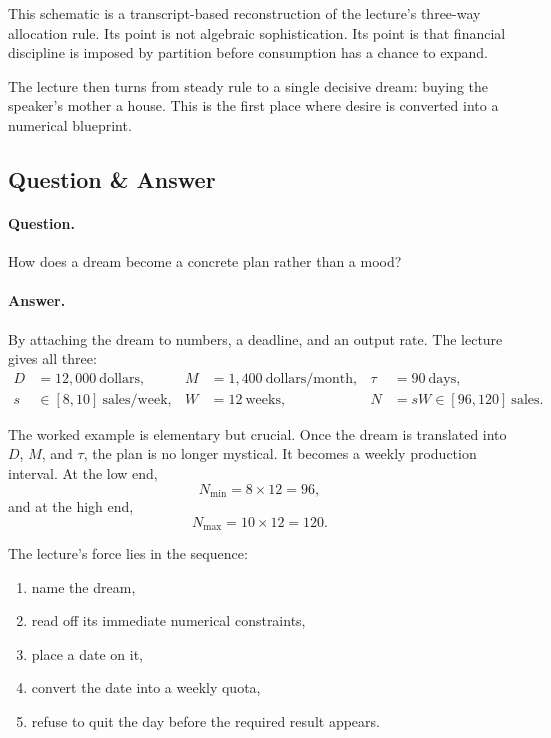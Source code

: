 This schematic is a transcript-based reconstruction of the lecture's three-way allocation rule. Its point is not algebraic sophistication. Its point is that financial discipline is imposed by partition before consumption has a chance to expand.

The lecture then turns from steady rule to a single decisive dream: buying the speaker's mother a house. This is the first place where desire is converted into a numerical blueprint.

\subsection{Question \& Answer}

\paragraph{Question.} How does a dream become a concrete plan rather than a mood?

\paragraph{Answer.} By attaching the dream to numbers, a deadline, and an output rate. The lecture gives all three:
\begin{align}
D &= 12{,}000\ \text{dollars}, &
M &= 1{,}400\ \text{dollars/month}, &
\tau &= 90\ \text{days}, \\
s &\in [8,10]\ \text{sales/week}, &
W &= 12\ \text{weeks}, &
N &= sW \in [96,120]\ \text{sales}.
\end{align}

The worked example is elementary but crucial. Once the dream is translated into \(D\), \(M\), and \(\tau\), the plan is no longer mystical. It becomes a weekly production interval. At the low end,
\begin{equation}
N_{\min} = 8 \times 12 = 96,
\end{equation}
and at the high end,
\begin{equation}
N_{\max} = 10 \times 12 = 120.
\end{equation}

The lecture's force lies in the sequence:
\begin{enumerate}
\item name the dream,
\item read off its immediate numerical constraints,
\item place a date on it,
\item convert the date into a weekly quota,
\item refuse to quit the day before the required result appears.
\end{enumerate}

